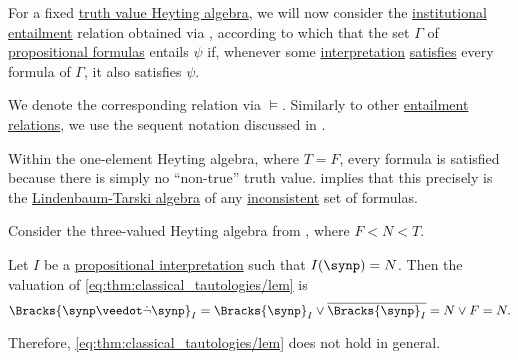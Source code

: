 \begin{definition}\label{def:propositional_entailment}\mimprovised
  For a fixed \hyperref[con:truth_value_algebra]{truth value Heyting algebra}, we will now consider the \hyperref[def:institutional_entailment]{institutional entailment} relation obtained via , according to which that the set \( \Gamma \) of \hyperref[def:propositional_syntax/formula]{propositional formulas} entails \( \psi \) if, whenever some \hyperref[def:propositional_valuation/interpretation]{interpretation} \hyperref[thm:propositional_institution/satisfaction]{satisfies} every formula of \( \Gamma \), it also satisfies \( \psi \).

  We denote the corresponding relation via \( {\vDash} \). Similarly to other \hyperref[def:entailment_system/entailment]{entailment relations}, we use the sequent notation discussed in .
\end{definition}

\begin{example}\label{ex:trivial_heyting_semantics}
  Within the one-element Heyting algebra, where \( T = F \), every formula is satisfied because there is simply no \enquote{non-true} truth value.  implies that this precisely is the \hyperref[def:lindenbaum_tarski_algebra]{Lindenbaum-Tarski algebra} of any \hyperref[def:consistent_set_of_sentences]{inconsistent} set of formulas.
\end{example}

\begin{example}\label{ex:heyting_semantics_lem_counterexample}
  Consider the three-valued Heyting algebra from , where \( F < N < T \).

  Let \( I \) be a \hyperref[def:propositional_valuation]{propositional interpretation} such that \( I(\synp) = N \). Then the valuation of \eqref{eq:thm:classical_tautologies/lem} is
  \begin{equation*}
    \Bracks{\synp \synvee \synneg \synp}_I
    =
    \Bracks{\synp}_I \vee \oline{\Bracks{\synp}_I}
    =
    N \vee F
    =
    N.
  \end{equation*}

  Therefore, \eqref{eq:thm:classical_tautologies/lem} does not hold in general.
\end{example}


